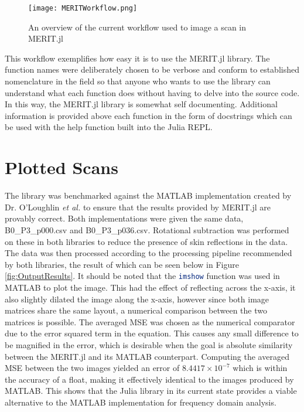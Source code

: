 \begin{figure}[h!]
    \texttt{[image: MERITWorkflow.png]}
    \centering
    \caption{An overview of the current workflow used to image a scan in MERIT.jl} 
    \label{fig:MERITWorkflow}
\end{figure}

This workflow exemplifies how easy it is to use the MERIT.jl library. The function names were deliberately chosen to be
verbose and conform to established nomenclature in the field so that anyone who wants to use the library can understand
what each function does without having to delve into the source code. In this way, the MERIT.jl library is somewhat self
documenting. Additional information is provided above each function in the form of docstrings which can be used with the
help function built into the Julia REPL. 

\section{Plotted Scans}
\label{PlottedScans}
The library was benchmarked against the MATLAB implementation created by Dr. O'Loughlin \textit{et al.} to ensure that
the results provided by MERIT.jl are provably correct. Both implementations were given the same data, B0\_P3\_p000.csv
and B0\_P3\_p036.csv. Rotational subtraction was performed on these in both libraries to reduce the presence of skin
reflections in the data. The data was then processed according to the processing pipeline recommended by both libraries,
the result of which can be seen below in Figure \ref{fig:OutputResults}. It should be noted that the
\lstinline[language=Octave]{imshow} function was used in MATLAB to plot the image. This had the effect of reflecting
across the x-axis, it also slightly dilated the image along the x-axis, however since both image matrices share the same
layout, a numerical comparison between the two matrices is possible. The averaged MSE was chosen as the numerical
comparator due to the error squared term in the equation. This causes any small difference to be magnified in the error,
which is desirable when the goal is absolute similarity between the MERIT.jl and its MATLAB counterpart. Computing the
averaged MSE between the two images yielded an error of $8.4417 \times 10^{-7}$ which is within the accuracy of a
float, making it effectively identical to the images produced by MATLAB. This shows that the Julia library in its
current state provides a viable alternative to the MATLAB implementation for frequency domain analysis.

